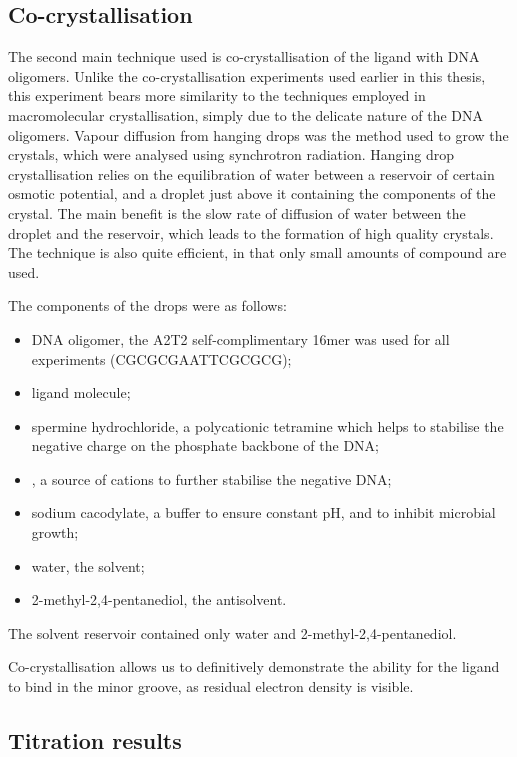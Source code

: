 \begin{refsection}
\subsection{Co-crystallisation}
The second main technique used is co-crystallisation of the ligand with DNA oligomers.
Unlike the co-crystallisation experiments used earlier in this thesis, this experiment bears more similarity to the techniques employed in macromolecular crystallisation, simply due to the delicate nature of the DNA oligomers.
Vapour diffusion from hanging drops was the method used to grow the crystals, which were analysed using synchrotron radiation.
Hanging drop crystallisation relies on the equilibration of water between a reservoir of certain osmotic potential, and a droplet just above it containing the components of the crystal.
The main benefit is the slow rate of diffusion of water between the droplet and the reservoir, which leads to the formation of high quality crystals.
The technique is also quite efficient, in that only small amounts of compound are used.

The components of the drops were as follows:
\begin{itemize}
    \item DNA oligomer, the A2T2 self-complimentary 16mer was used for all experiments (CGCGCGAATTCGCGCG);
    \item ligand molecule;
    \item spermine hydrochloride, a polycationic tetramine which helps to stabilise the negative charge on the phosphate backbone of the DNA;
    \item {}, a source of  cations to further stabilise the negative DNA;
    \item sodium cacodylate, a buffer to ensure constant pH, and to inhibit microbial growth;
    \item water, the solvent;
    \item 2-methyl-2,4-pentanediol, the antisolvent.
\end{itemize}

The solvent reservoir contained only water and 2-methyl-2,4-pentanediol.

Co-crystallisation allows us to definitively demonstrate the ability for the ligand to bind in the minor groove, as residual electron density is visible.

\subsection{Titration results}


\end{refsection}
